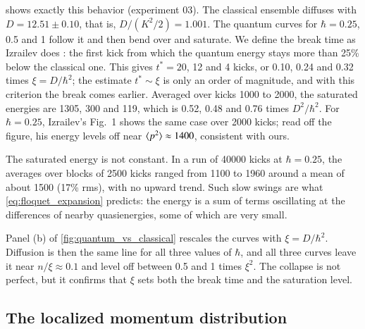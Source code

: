  shows exactly this behavior (experiment 03). The classical ensemble diffuses
with $D = 12.51 \pm 0.10$, that is, $D/(K^2/2) = 1.001$. The quantum curves for $\hbar = 0.25$, 0.5 and 1
follow it and then bend over and saturate. We define the break time as Izrailev does \cite{Izrailev1990}: the
first kick from which the quantum energy stays more than 25\% below the classical one. This gives
$t^* = 20$, 12 and 4 kicks, or 0.10, 0.24 and 0.32 times $\xi = D/\hbar^2$; the estimate $t^* \sim \xi$ is only
an order of magnitude, and with this criterion the break comes earlier. Averaged over kicks 1000 to 2000, the
saturated energies are 1305, 300 and 119, which is 0.52, 0.48 and 0.76 times $D^2/\hbar^2$. For
$\hbar = 0.25$, Izrailev's Fig.~1 shows the same case over 2000 kicks; read off the figure, his energy levels
off near $\langle p^2 \rangle \approx 1400$, consistent with ours.

The saturated energy is not constant. In a run of 40000 kicks at $\hbar = 0.25$, the averages over blocks of
2500 kicks ranged from 1100 to 1960 around a mean of about 1500 (17\% rms), with no upward trend. Such slow
swings are what \cref{eq:floquet_expansion} predicts: the energy is a sum of terms oscillating at the
differences of nearby quasienergies, some of which are very small.

Panel (b) of \cref{fig:quantum_vs_classical} rescales the curves with $\xi = D/\hbar^2$. Diffusion is then
the same line for all three values of $\hbar$, and all three curves leave it near $n/\xi \approx 0.1$ and
level off between 0.5 and 1 times $\xi^2$. The collapse is not perfect, but it confirms that $\xi$ sets both
the break time and the saturation level.

\subsection{The localized momentum distribution}
\label{sec:distribution}

